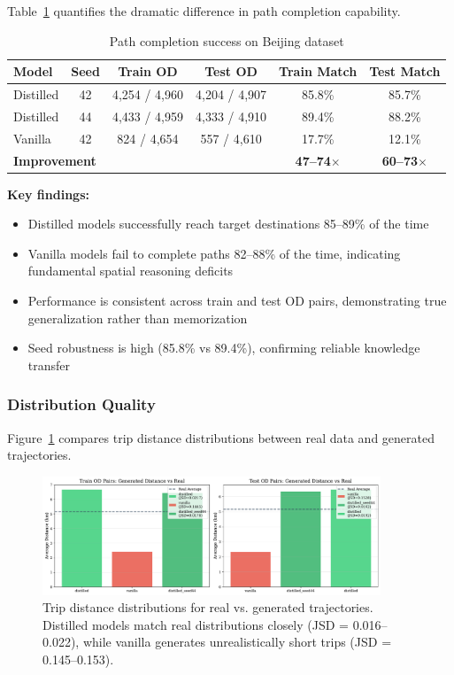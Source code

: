 Table~\ref{tab:od-results} quantifies the dramatic difference in path completion capability.

\begin{table}[h]
\centering
\caption{Path completion success on Beijing dataset}
\label{tab:od-results}
\small
\begin{tabular}{lccccc}
\toprule
\textbf{Model} & \textbf{Seed} & \textbf{Train OD} & \textbf{Test OD} & \textbf{Train Match} & \textbf{Test Match} \\
\midrule
Distilled & 42 & 4,254 / 4,960 & 4,204 / 4,907 & 85.8\% & 85.7\% \\
Distilled & 44 & 4,433 / 4,959 & 4,333 / 4,910 & 89.4\% & 88.2\% \\
Vanilla & 42 & 824 / 4,654 & 557 / 4,610 & 17.7\% & 12.1\% \\
\midrule
\multicolumn{4}{l}{\textbf{Improvement}} & \textbf{47--74$\times$} & \textbf{60--73$\times$} \\
\bottomrule
\end{tabular}
\end{table}

\textbf{Key findings:}
\begin{itemize}[noitemsep,topsep=0pt]
\item Distilled models successfully reach target destinations 85--89\% of the time
\item Vanilla models fail to complete paths 82--88\% of the time, indicating fundamental spatial reasoning deficits
\item Performance is consistent across train and test OD pairs, demonstrating true generalization rather than memorization
\item Seed robustness is high (85.8\% vs 89.4\%), confirming reliable knowledge transfer
\end{itemize}

\subsubsection{Distribution Quality}

Figure~\ref{fig:distance-distributions} compares trip distance distributions between real data and generated trajectories.

\begin{figure}[h]
\centering
\includegraphics[width=0.9\textwidth]{assets/plots/hoser/distance_distributions.pdf}
\caption{Trip distance distributions for real vs. generated trajectories. Distilled models match real distributions closely (JSD = 0.016--0.022), while vanilla generates unrealistically short trips (JSD = 0.145--0.153).}
\label{fig:distance-distributions}
\end{figure}

